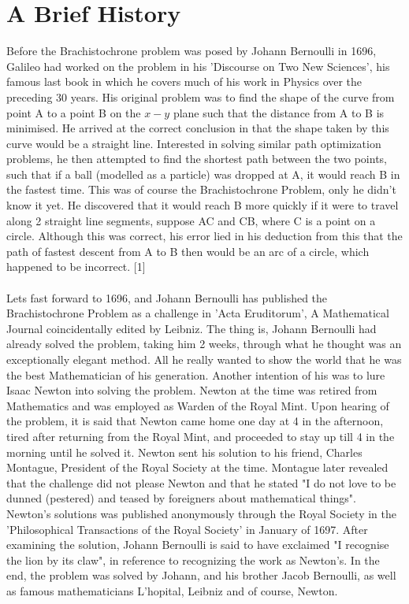 \documentclass[12pt]{report}
\begin{document}
\section{A Brief History}
Before the Brachistochrone problem was posed by Johann Bernoulli in 1696, Galileo had worked on the problem in his 'Discourse on Two New Sciences', his famous last book in which he covers much of his work in Physics over the preceding 30 years. His original problem was to find the shape of the curve from point A to a point B on the \(x-y\) plane such that the distance from A to B is minimised. He arrived at the correct conclusion in that the shape taken by this curve would be a straight line. Interested in solving similar path optimization problems, he then attempted to find the shortest path between the two points, such that if a ball (modelled as a particle) was dropped at A, it would reach B in the fastest time. This was of course the Brachistochrone Problem, only he didn't know it yet. He discovered that it would reach B more quickly if it were to travel along 2 straight line segments, suppose AC and CB, where C is a point on a circle. Although this was correct, his error lied in his deduction from this that the path of fastest descent from A to B then would be an arc of a circle, which happened to be incorrect. [1]
\\
\\
Lets fast forward to 1696, and Johann Bernoulli has published the Brachistochrone Problem as a challenge in 'Acta Eruditorum', A Mathematical Journal coincidentally edited by Leibniz. The thing is, Johann Bernoulli had already solved the problem, taking him 2 weeks, through what he thought was an exceptionally elegant method. All he really wanted to show the world that he was the best Mathematician of his generation. Another intention of his was to lure Isaac Newton into solving the problem. Newton at the time was retired from Mathematics and was employed as Warden of the Royal Mint. Upon hearing of the problem, it is said that Newton came home one day at 4 in the afternoon, tired after returning from the Royal Mint, and proceeded to stay up till 4 in the morning until he solved it. Newton sent his solution to his friend, Charles Montague, President of the Royal Society at the time. Montague later revealed that the challenge did not please Newton and that he stated "I do not love to be dunned (pestered) and teased by foreigners about mathematical things". Newton's solutions was published anonymously through the Royal Society in the 'Philosophical Transactions of the Royal Society' in January of 1697. After examining the solution, Johann Bernoulli is said to have exclaimed "I recognise the lion by its claw", in reference to recognizing the work as Newton's. In the end, the problem was solved by Johann, and his brother Jacob Bernoulli, as well as famous mathematicians L'hopital, Leibniz and of course, Newton.
\end{document}
